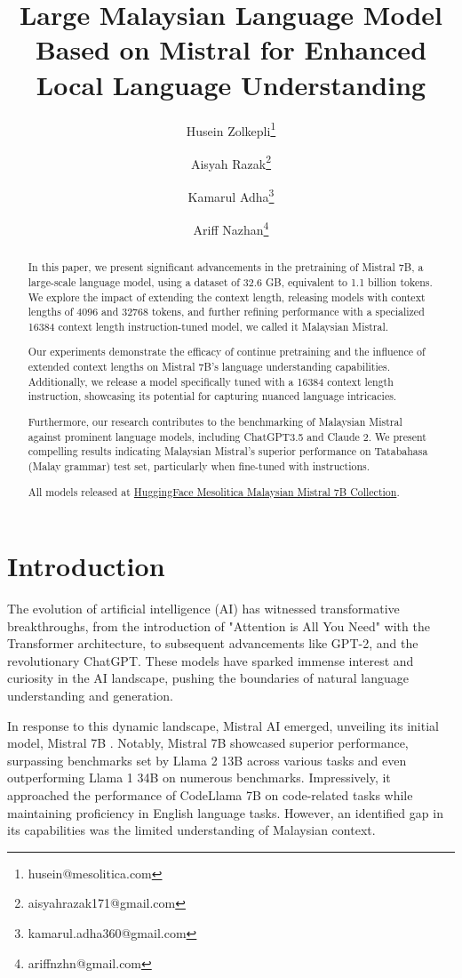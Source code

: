 \documentclass[preprint]{article}
\title{Large Malaysian Language Model Based on Mistral for Enhanced Local Language Understanding}
\author{
  Husein Zolkepli\thanks{husein@mesolitica.com} \and 
  Aisyah Razak\thanks{aisyahrazak171@gmail.com} \and
  Kamarul Adha\thanks{kamarul.adha360@gmail.com} \and
  Ariff Nazhan\thanks{ariffnzhn@gmail.com}
}
\begin{document}
\maketitle

\begin{abstract}
  In this paper, we present significant advancements in the pretraining of Mistral 7B, a large-scale language model, using a dataset of 32.6 GB, equivalent to 1.1 billion tokens. We explore the impact of extending the context length, releasing models with context lengths of 4096 and 32768 tokens, and further refining performance with a specialized 16384 context length instruction-tuned model, we called it Malaysian Mistral.

  Our experiments demonstrate the efficacy of continue pretraining and the influence of extended context lengths on Mistral 7B's language understanding capabilities. Additionally, we release a model specifically tuned with a 16384 context length instruction, showcasing its potential for capturing nuanced language intricacies.

  Furthermore, our research contributes to the benchmarking of Malaysian Mistral against prominent language models, including ChatGPT3.5 and Claude 2. We present compelling results indicating Malaysian Mistral's superior performance on Tatabahasa (Malay grammar) test set, particularly when fine-tuned with instructions.

  All models released at \href{https://huggingface.co/collections/mesolitica/malaysian-mistral-7b-6528f2ec825f4bba46c1700c}{HuggingFace Mesolitica Malaysian Mistral 7B Collection}.
\end{abstract}

\section{Introduction}
The evolution of artificial intelligence (AI) has witnessed transformative breakthroughs, from the introduction of "Attention is All You Need" \cite{vaswani2023attention} with the Transformer architecture, to subsequent advancements like GPT-2, and the revolutionary ChatGPT. These models have sparked immense interest and curiosity in the AI landscape, pushing the boundaries of natural language understanding and generation.

In response to this dynamic landscape, Mistral AI emerged, unveiling its initial model, Mistral 7B \cite{jiang2023mistral}. Notably, Mistral 7B showcased superior performance, surpassing benchmarks set by Llama 2 13B across various tasks and even outperforming Llama 1 34B on numerous benchmarks. Impressively, it approached the performance of CodeLlama 7B on code-related tasks while maintaining proficiency in English language tasks. However, an identified gap in its capabilities was the limited understanding of Malaysian context.
\end{document}
